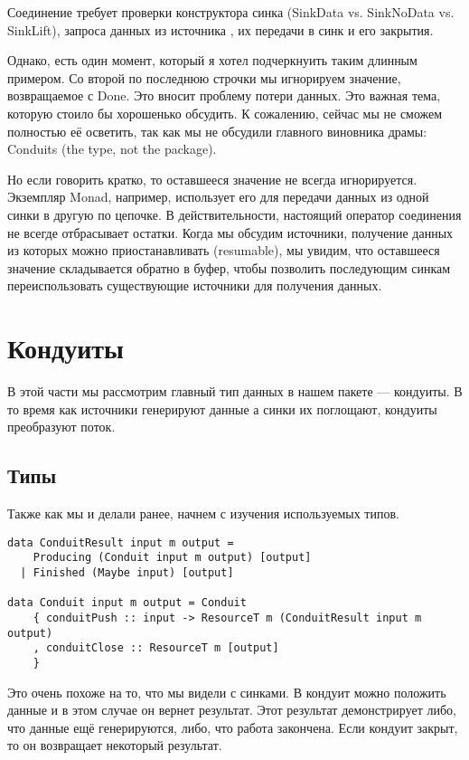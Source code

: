 Соединение требует проверки конструктора синка (SinkData vs. 
SinkNoData vs. SinkLift), запроса данных из источника , их передачи в синк и его закрытия.

Однако, есть один момент, который я хотел подчеркнуить таким длинным примером. Со второй
по последнюю строчки мы игнорируем значение, возвращаемое с Done. Это вносит проблему
потери данных. Это важная тема, которую стоило бы хорошенько обсудить. К сожалению,
сейчас мы не сможем полностью её осветить, так как мы не обсудили главного виновника
драмы: Conduits (the type, not the package). %

Но если говорить кратко, то оставшееся значение не всегда игнорируется. Экземпляр Monad,
например, использует его для передачи данных из одной синки в другую по цепочке.
В действительности, настоящий оператор соединения не всегде отбрасывает остатки. Когда мы
обсудим источники, получение данных из которых можно приостанавливать (resumable), мы
увидим, что оставшееся значение складывается обратно в буфер, чтобы позволить последующим
синкам переиспользовать существующие источники для получения данных.

\section{Кондуиты}

В этой части мы рассмотрим главный тип данных в нашем пакете --- кондуиты. В то время как
источники генерируют данные а синки их поглощают, кондуиты преобразуют поток.

\subsection{Типы}

Также как мы и делали ранее, начнем с изучения используемых типов.
\begin{lstlisting}
data ConduitResult input m output =
    Producing (Conduit input m output) [output]
  | Finished (Maybe input) [output]

data Conduit input m output = Conduit
    { conduitPush :: input -> ResourceT m (ConduitResult input m output)
    , conduitClose :: ResourceT m [output]
    }
\end{lstlisting}
Это очень похоже на то, что мы видели с синками. В кондуит можно положить данные и в этом
случае он вернет результат. Этот результат демонстрирует либо, что данные ещё
генерируются, либо, что работа закончена. Если кондуит закрыт, то он возвращает некоторый
результат.


